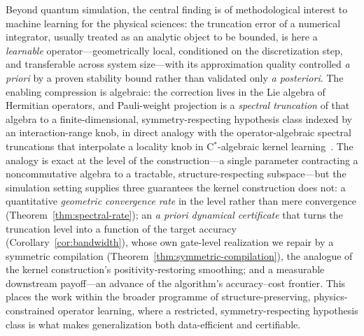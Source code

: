 \documentclass[aps,prresearch,reprint,superscriptaddress,nofootinbib,amsmath,amssymb]{revtex4-2}
\begin{document}
Beyond quantum simulation, the central finding is of methodological interest to machine learning for the physical sciences: the truncation error of a numerical integrator, usually treated as an analytic object to be bounded, is here a \emph{learnable} operator---geometrically local, conditioned on the discretization step, and transferable across system size---with its approximation quality controlled \emph{a priori} by a proven stability bound rather than validated only \emph{a posteriori}. The enabling compression is algebraic: the correction lives in the Lie algebra of Hermitian operators, and Pauli-weight projection is a \emph{spectral truncation} of that algebra to a finite-dimensional, symmetry-respecting hypothesis class indexed by an interaction-range knob, in direct analogy with the operator-algebraic spectral truncations that interpolate a locality knob in C$^\ast$-algebraic kernel learning~\cite{hashimoto2024spectral,hashimoto2023rkhm}. The analogy is exact at the level of the construction---a single parameter contracting a noncommutative algebra to a tractable, structure-respecting subspace---but the simulation setting supplies three guarantees the kernel construction does not: a quantitative \emph{geometric convergence rate} in the level rather than mere convergence (Theorem~\ref{thm:spectral-rate}); an \emph{a priori dynamical certificate} that turns the truncation level into a function of the target accuracy (Corollary~\ref{cor:bandwidth}), whose own gate-level realization we repair by a symmetric compilation (Theorem~\ref{thm:symmetric-compilation}), the analogue of the kernel construction's positivity-restoring smoothing; and a measurable downstream payoff---an advance of the algorithm's accuracy--cost frontier. This places the work within the broader programme of structure-preserving, physics-constrained operator learning, where a restricted, symmetry-respecting hypothesis class is what makes generalization both data-efficient and certifiable.
\end{document}
